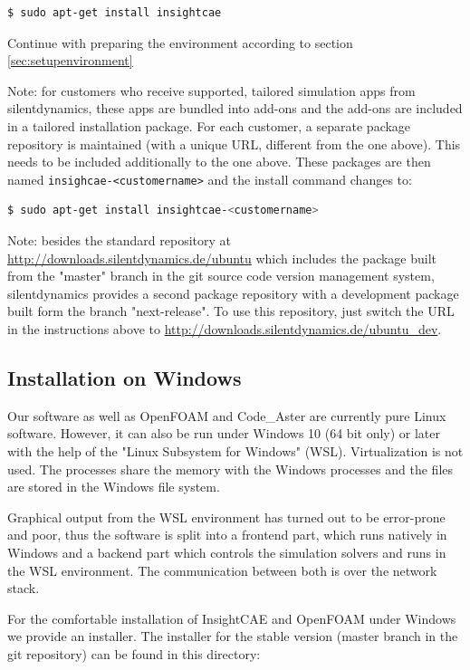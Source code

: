 \begin{lstlisting}[language=bash]
$ sudo apt-get install insightcae
\end{lstlisting}

Continue with preparing the environment according to section \ref{sec:setupenvironment}

Note: for customers who receive supported, tailored simulation apps from silentdynamics, these apps are bundled into add-ons and the add-ons are included in a tailored installation package.
For each customer, a separate package repository is maintained (with a unique URL, different from the one above).
This needs to be included additionally to the one above.
These packages are then named \texttt{insighcae-<customername>} and the install command changes to:
\begin{lstlisting}[language=bash]
$ sudo apt-get install insightcae-<customername>
\end{lstlisting}

Note: besides the standard repository at \url{http://downloads.silentdynamics.de/ubuntu} which includes the package built from the "master" branch in the git source code version management system, silentdynamics provides a second package repository with a development package built form the branch "next-release".
To use this repository, just switch the URL in the instructions above to
\url{http://downloads.silentdynamics.de/ubuntu_dev}.

\subsection{Installation on Windows}
Our software as well as OpenFOAM and Code\_Aster are currently pure Linux software. 
However, it can also be run under Windows 10 (64 bit only) or later with the help of the "Linux Subsystem for Windows" (WSL).
Virtualization is not used. 
The processes share the memory with the Windows processes and the files are stored in the Windows file system. 

Graphical output from the WSL environment has turned out to be error-prone and poor, thus the software is split into a frontend part, which runs natively in Windows and a backend part which controls the simulation solvers and runs in the WSL environment.
The communication between both is over the network stack.

For the comfortable installation of InsightCAE and OpenFOAM under Windows we provide an installer.
The installer for the stable version (master branch in the git repository) can be found in this directory:

